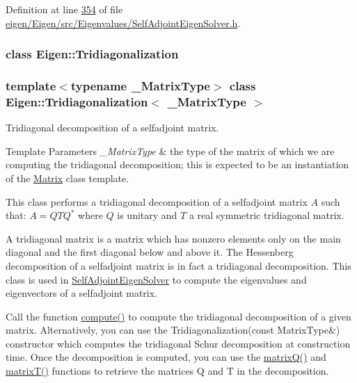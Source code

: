 Definition at line \hyperlink{eigen_2_eigen_2src_2_eigenvalues_2_self_adjoint_eigen_solver_8h_source_l00354}{354} of file \hyperlink{eigen_2_eigen_2src_2_eigenvalues_2_self_adjoint_eigen_solver_8h_source}{eigen/\+Eigen/src/\+Eigenvalues/\+Self\+Adjoint\+Eigen\+Solver.\+h}.

\label{class_eigen_1_1_tridiagonalization}
\subsubsection{class Eigen\+:\+:Tridiagonalization}
\subsubsection*{template$<$typename \+\_\+\+Matrix\+Type$>$\newline
class Eigen\+::\+Tridiagonalization$<$ \+\_\+\+Matrix\+Type $>$}

Tridiagonal decomposition of a selfadjoint matrix. 


\begin{DoxyTemplParams}{Template Parameters}
{\em \+\_\+\+Matrix\+Type} & the type of the matrix of which we are computing the tridiagonal decomposition; this is expected to be an instantiation of the \hyperlink{group___core___module_class_eigen_1_1_matrix}{Matrix} class template.\\
\hline
\end{DoxyTemplParams}
This class performs a tridiagonal decomposition of a selfadjoint matrix $ A $ such that\+: $ A = Q T Q^* $ where $ Q $ is unitary and $ T $ a real symmetric tridiagonal matrix.

A tridiagonal matrix is a matrix which has nonzero elements only on the main diagonal and the first diagonal below and above it. The Hessenberg decomposition of a selfadjoint matrix is in fact a tridiagonal decomposition. This class is used in \hyperlink{group___eigenvalues___module_class_eigen_1_1_self_adjoint_eigen_solver}{Self\+Adjoint\+Eigen\+Solver} to compute the eigenvalues and eigenvectors of a selfadjoint matrix.

Call the function \hyperlink{group___eigenvalues___module_acd288abb081d3b40b87e4b98cd8f6ee9}{compute()} to compute the tridiagonal decomposition of a given matrix. Alternatively, you can use the Tridiagonalization(const Matrix\+Type\&) constructor which computes the tridiagonal Schur decomposition at construction time. Once the decomposition is computed, you can use the \hyperlink{group___eigenvalues___module_a000f7392eda930576ffd2af1fae54af2}{matrix\+Q()} and \hyperlink{group___eigenvalues___module_a6eb5ef94b8b9bb013c0e69b6df56d0df}{matrix\+T()} functions to retrieve the matrices Q and T in the decomposition.

